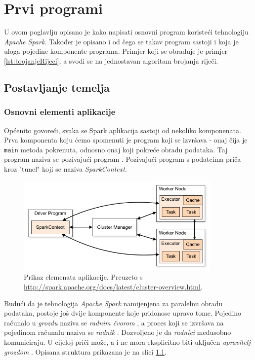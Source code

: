 \documentclass[times, utf8, zavrsni]{fer}
\begin{document}
\chapter{Prvi programi}
U ovom poglavlju opisano je kako napisati osnovni program koristeći tehnologiju \emph{Apache Spark}. Također je opisano i od čega se takav program sastoji i koja je uloga pojedine komponente programa. Primjer koji se obrađuje je primjer \ref{lst:brojanjeRijeci}, a svodi se na jednostavan algoritam brojanja riječi.

\section{Postavljanje temelja}
\subsection{Osnovni elementi aplikacije}
Općenito govoreći, svaka se Spark aplikacija sastoji  od nekoliko komponenata. Prva komponenta koju ćemo spomenuti je program koji se izvršava - onaj čija je \texttt{main} metoda pokrenuta, odnosno onaj koji pokreće obradu podataka. Taj program naziva se pozivajući program . Pozivajući program s podatcima priča kroz "tunel" koji se naziva \emph{SparkContext}.

\begin{figure}[htb]
\centering
\includegraphics[width=10cm]{img/cluster-overview.png}
\caption{Prikaz elemenata aplikacije. Preuzeto s \protect\url{http://spark.apache.org/docs/latest/cluster-overview.html}.}
\label{fig:cluster-overview}
\end{figure}

Budući da je tehnologija \emph{Apache Spark} namijenjena za paralelnu obradu podataka, postoje još dvije komponente koje pridonose upravo tome. Pojedino računalo u \emph{grozdu}  naziva se \emph{radnim čvorom} , a proces koji se izvršava na pojedinom računalu naziva se \emph{radnik} . Dozvoljeno je da \emph{radnici} međusobno komuniciraju. U cijeloj priči može, a i ne mora eksplicitno biti uključen \emph{upravitelj grozdom} .
Opisana struktura prikazana je na slici \ref{fig:cluster-overview}.
\end{document}
